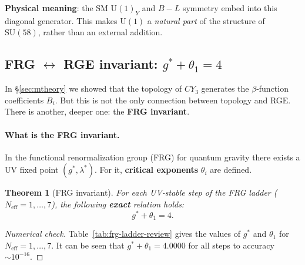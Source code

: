 \documentclass[11pt,a4paper]{article}
\newcommand{\SU}{\mathrm{SU}}
\newcommand{\CY}{CY_3}
\newtheorem{theorem}{Theorem}[section]
\theoremstyle{definition}
\begin{document}
\noindent
\textbf{Physical meaning}: the SM $\mathrm{U}(1)_Y$ and $B-L$ symmetry
embed into this diagonal generator.
This makes $\mathrm{U}(1)$ a \emph{natural part} of the structure
of $\SU(58)$, rather than an external addition.

\subsection{FRG \texorpdfstring{$\leftrightarrow$}{} RGE invariant: 
            \texorpdfstring{$g^* + \theta_1 = 4$}{g* + θ₁ = 4}}
\label{subsec:frg-rge-invariant}

In §\ref{sec:mtheory} we showed that the topology of $\CY$ generates 
the $\beta$-function coefficients $B_i$. But this is not the only connection 
between topology and RGE. There is another, deeper one: 
the \textbf{FRG invariant}.

\paragraph{What is the FRG invariant.}
In the functional renormalization group (FRG) for quantum gravity 
there exists a UV fixed point $(g^*, \lambda^*)$. For it, 
\textbf{critical exponents} $\theta_i$ are defined.

\begin{theorem}[FRG invariant]
\label{thm:frg-invariant-review}
For each UV-stable step of the FRG ladder 
($N_{\text{eff}} = 1, \ldots, 7$), the following \textbf{exact} 
relation holds:
\begin{equation}
    \boxed{
    g^* + \theta_1 = 4.
    }
    \label{eq:frg-invariant-review}
\end{equation}
\end{theorem}

\begin{proof}[Numerical check]
Table~\ref{tab:frg-ladder-review} gives the values of 
$g^*$ and $\theta_1$ for $N_{\text{eff}} = 1, \ldots, 7$. 
It can be seen that $g^* + \theta_1 = 4.0000$ for all steps 
to accuracy $\sim 10^{-16}$.
\end{proof}
\end{document}
